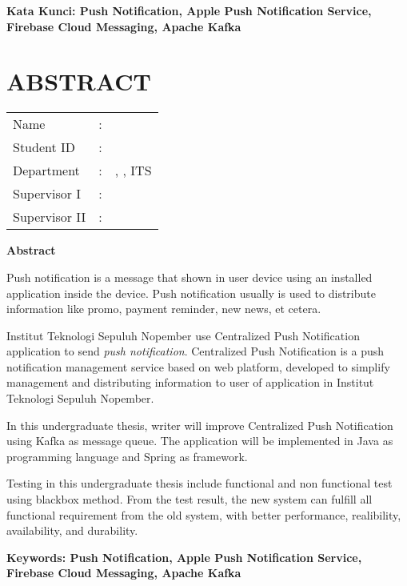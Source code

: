 \vspace*{1em}
\noindent\bfseries Kata Kunci: Push Notification, Apple Push Notification Service, Firebase Cloud Messaging, Apache Kafka
\normalfont
\cleardoublepage

\chapter {ABSTRACT}
\begin{center}
	\noindent\textbf{\MakeUppercase\juduleng}
\end{center}
\vspace*{1em}

\begin{tabularx}{\linewidth}{ l l X }
	Name 			& : & \penulis \\
	Student ID		& :	& \nrp \\
	Department 		& : & \jurusaneng, \newline \fakultaseng, ITS \\
	Supervisor I 	& : & \pembimbingsatu \\
	Supervisor II 	& : & \pembimbingdua
	\vspace*{1em} 	%
\end {tabularx}
	
\noindent\textbf{Abstract} \\
\itshape
\par Push notification is a message that shown in user device using an installed application inside the device. Push notification usually is used to distribute information like promo, payment reminder, new news, et cetera.
\par Institut Teknologi Sepuluh Nopember use Centralized Push Notification application to send \textit{push notification}. Centralized Push Notification is a push notification management service based on web platform, developed to simplify management and distributing information to user of application in Institut Teknologi Sepuluh Nopember.
\par In this undergraduate thesis, writer will improve Centralized Push Notification using Kafka as message queue. The application will be implemented in Java as programming language and Spring as framework.
\par Testing in this undergraduate thesis include functional and non functional test using blackbox method. From the test result, the new system can fulfill all functional requirement from the old system, with better performance, realibility, availability, and durability.

\vspace*{1em}
\noindent\bfseries Keywords: Push Notification, Apple Push Notification Service, Firebase Cloud Messaging, Apache Kafka
\normalfont
\cleardoublepage